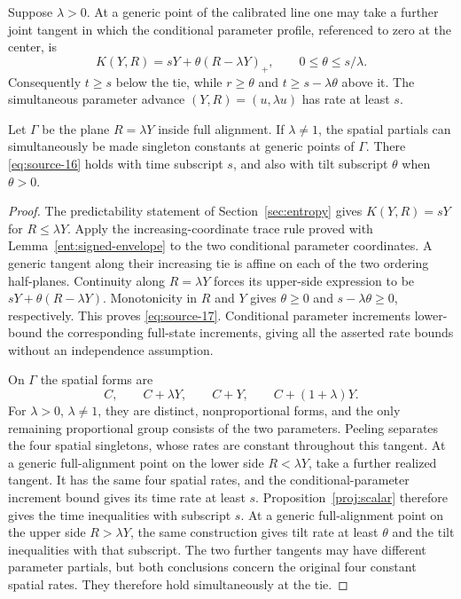 \begin{proposition}
\label{proj:parameter-profile}
Suppose $\lambda>0$. At a generic point of the calibrated line one
may take a further joint tangent in which the conditional parameter
profile, referenced to zero at the center, is
\begin{equation}
 K(Y,R)=sY+\theta(R-\lambda Y)_+,
 \qquad 0\le\theta\le s/\lambda.
 \label{eq:source-17}
\end{equation}
Consequently $t\ge s$ below the tie, while $r\ge\theta$ and
$t\ge s-\lambda\theta$ above it. The simultaneous parameter
advance $(Y,R)=(u,\lambda u)$ has rate at least $s$.

Let $\Gamma$ be the plane $R=\lambda Y$ inside full alignment. If
$\lambda\ne1$, the spatial partials can simultaneously be made
singleton constants at generic points of $\Gamma$. There
\eqref{eq:source-16} holds with time subscript $s$, and also with
tilt subscript $\theta$ when $\theta>0$.
\end{proposition}

\begin{proof}
The predictability statement of Section~\ref{sec:entropy} gives
$K(Y,R)=sY$ for $R\le\lambda Y$. Apply the increasing-coordinate
trace rule proved with Lemma~\ref{ent:signed-envelope} to the two
conditional parameter coordinates. A generic tangent along their
increasing tie is affine on each of the two ordering half-planes.
Continuity along $R=\lambda Y$ forces its upper-side expression to
be $sY+\theta(R-\lambda Y)$. Monotonicity in $R$ and $Y$ gives
$\theta\ge0$ and $s-\lambda\theta\ge0$, respectively. This proves
\eqref{eq:source-17}. Conditional parameter increments lower-bound
the corresponding full-state increments, giving all the asserted
rate bounds without an independence assumption.

On $\Gamma$ the spatial forms are
\[
 C,\qquad C+\lambda Y,\qquad C+Y,
 \qquad C+(1+\lambda)Y.
\]
For $\lambda>0$, $\lambda\ne1$, they are distinct,
nonproportional forms, and the only remaining proportional group
consists of the two parameters. Peeling separates the four spatial
singletons, whose rates are constant throughout this tangent.
At a generic full-alignment point on the lower side $R<\lambda Y$,
take a further realized tangent. It has the same four spatial rates,
and the conditional-parameter increment bound gives its time rate
at least $s$. Proposition~\ref{proj:scalar} therefore gives the time
inequalities with subscript $s$. At a generic full-alignment point
on the upper side $R>\lambda Y$, the same construction gives tilt
rate at least $\theta$ and the tilt inequalities with that subscript.
The two further tangents may have different parameter partials, but
both conclusions concern the original four constant spatial rates.
They therefore hold simultaneously at the tie.
\end{proof}

